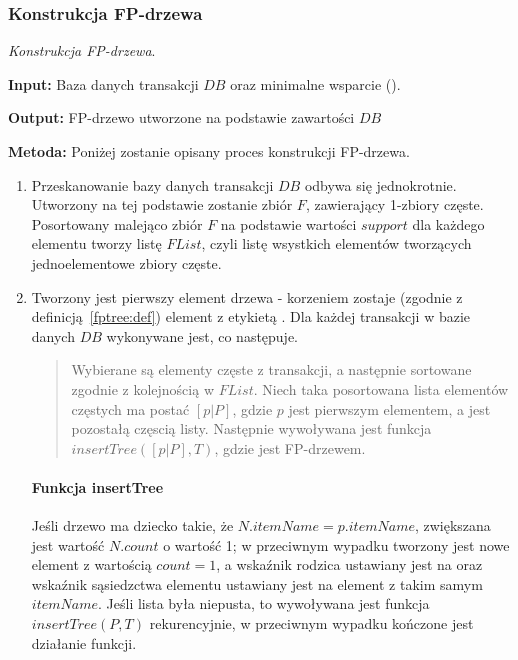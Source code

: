 \subsubsection{Konstrukcja FP-drzewa}\label{fptree:construction}
\begin{alg}\label{alg:fptre:econstruction}
	\emph{Konstrukcja FP-drzewa}.

	\textbf{Input:} Baza danych transakcji $DB$ oraz minimalne wsparcie ().

	\textbf{Output:} FP-drzewo utworzone na podstawie zawartości $DB$

	\textbf{Metoda:} Poniżej zostanie opisany proces konstrukcji FP-drzewa.

	\begin{enumerate}
		\item Przeskanowanie bazy danych transakcji $DB$ odbywa się jednokrotnie. Utworzony na tej podstawie zostanie zbiór $F$, zawierający 1-zbiory częste. Posortowany malejąco zbiór $F$ na podstawie wartości $support$ dla każdego elementu tworzy listę $FList$, czyli listę wsystkich elementów tworzących jednoelementowe zbiory częste.
		\item Tworzony jest pierwszy element drzewa - korzeniem zostaje (zgodnie z definicją~\ref{fptree:def}) element z etykietą . Dla każdej transakcji w bazie danych $DB$ wykonywane jest, co następuje.
		\begin{quote}
			Wybierane są elementy częste z transakcji, a następnie sortowane zgodnie z kolejnością w $FList$. Niech taka posortowana lista elementów częstych ma postać $[p|P]$, gdzie $p$ jest pierwszym elementem, a  jest pozostałą częscią listy. Następnie wywoływana jest funkcja $insertTree([p|P], T)$, gdzie  jest FP-drzewem.
		\end{quote}
			\paragraph{Funkcja insertTree} Jeśli drzewo  ma dziecko  takie, że $N.itemName = p.itemName$, zwiększana jest wartość $N.count$ o wartość 1; w przeciwnym wypadku tworzony jest nowe element  z wartością $count = 1$, a wskaźnik rodzica ustawiany jest na  oraz wskaźnik sąsiedzctwa elementu ustawiany jest na element z takim samym $itemName$. Jeśli lista  była niepusta, to wywoływana jest funkcja $insertTree(P, T)$ rekurencyjnie, w przeciwnym wypadku kończone jest działanie funkcji.
	\end{enumerate}
\end{alg}

